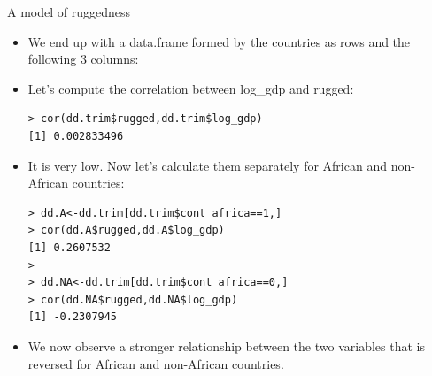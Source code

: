 \documentclass[handout]{beamer}
\begin{document}
\begin{frame}[fragile]{A model of ruggedness}
\scriptsize{

\begin{itemize}
\item We end up with a data.frame formed by the countries as rows and the following 3 columns: 



\item Let's compute the correlation between log\_gdp and rugged:

\begin{verbatim}
> cor(dd.trim$rugged,dd.trim$log_gdp)
[1] 0.002833496 
\end{verbatim}

\item It is very low. Now let's calculate them separately for African and non-African countries:

\begin{verbatim}
> dd.A<-dd.trim[dd.trim$cont_africa==1,]
> cor(dd.A$rugged,dd.A$log_gdp)
[1] 0.2607532
> 
> dd.NA<-dd.trim[dd.trim$cont_africa==0,]
> cor(dd.NA$rugged,dd.NA$log_gdp)
[1] -0.2307945 
\end{verbatim}

\item We now observe a stronger relationship between the two variables that is reversed for African and non-African countries.

\end{itemize}




} 
\end{frame}
\end{document}

